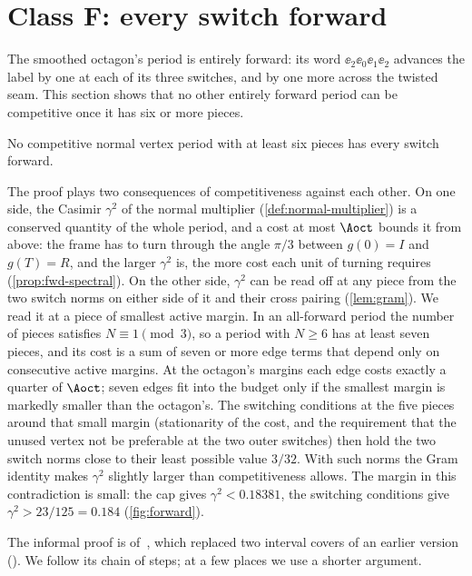 \section{Class F: every switch forward}\label{sec:forward}

The smoothed octagon's period is entirely forward: its word $\ee_2\ee_0\ee_1\ee_2$ advances the
label by one at each of its three switches, and by one more across the twisted seam. This section
shows that no other entirely forward period can be competitive once it has six or more pieces.

\begin{theorem}[Class F]\label{thm:class-F}
No competitive normal vertex period with at least six pieces has every switch forward.
\end{theorem}

The proof plays two consequences of competitiveness against each other. On one side, the Casimir
$\gamma^2$ of the normal multiplier (\cref{def:normal-multiplier}) is a conserved quantity of the
whole period, and a cost at most $\Aoct$ bounds it from above: the frame has to turn through the
angle $\pi/3$ between $g(0)=I$ and $g(T)=R$, and the larger $\gamma^2$ is, the more cost each unit
of turning requires (\cref{prop:fwd-spectral}). On the other side, $\gamma^2$ can be read off at
any piece from the two switch norms on either side of it and their cross pairing
(\cref{lem:gram}). We read it at a piece of smallest active margin. In an all-forward period the
number of pieces satisfies $N\equiv1\pmod 3$, so a period with $N\ge6$ has at least seven pieces,
and its cost is a sum of seven or more edge terms that depend only on consecutive active margins.
At the octagon's margins each edge costs exactly a quarter of $\Aoct$; seven edges fit into the
budget only if the smallest margin is markedly smaller than the octagon's. The switching conditions
at the five pieces around that small margin (stationarity of the cost, and the requirement that the
unused vertex not be preferable at the two outer switches) then hold the two switch norms close to
their least possible value $3/32$. With such norms the Gram identity makes $\gamma^2$ slightly
larger than competitiveness allows. The margin in this contradiction is small: the cap gives
$\gamma^2<0.18381$, the switching conditions give $\gamma^2>23/125=0.184$ (\cref{fig:forward}).

The informal proof is  of~\cite{Notes}, which replaced
two interval covers of an earlier version (). We follow
its chain of steps; at a few places we use a shorter argument.

